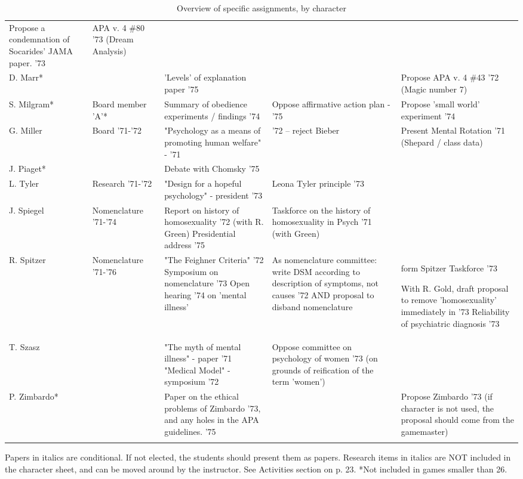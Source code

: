 \begin{refsection}
\begin{longtable}[!t]{ | p{1cm} | p{2cm} | p{6cm} |  p{3cm} |  p{3cm} | }
Propose a condemnation of Socarides' JAMA paper. '73&
APA v. 4 \#80 '73 (Dream Analysis)\\
D. Marr*&
&
'Levels' of explanation paper '75&
&
Propose APA v. 4 \#43 '72 (Magic number 7)\\
S. Milgram*&
Board member 'A'*&
Summary of obedience experiments / findings '74&
Oppose affirmative action plan - '75&
Propose 'small world' experiment '74\\
G. Miller&
Board '71-'72&
"Psychology as a means of promoting human welfare" - '71&
'72 – reject Bieber&
Present Mental Rotation '71 (Shepard / class data)\\
J. Piaget*&
&
Debate with Chomsky '75&
&
\\
L. Tyler&
Research '71-'72&
"Design for a hopeful psychology" - president '73&
Leona Tyler principle '73&
\\
J. Spiegel&
Nomenclature '71-'74&
Report on history of homosexuality '72 (with R. Green)
Presidential address '75&
Taskforce on the history of homosexuality in Psych '71 (with Green)&
\\
R. Spitzer&
Nomenclature '71-'76&
"The Feighner Criteria" '72\newline
Symposium on nomenclature '73\newline
Open hearing '74 on 'mental illness'&

As nomenclature committee: write DSM according to description of symptoms, not causes '72
AND proposal to disband nomenclature & form Spitzer Taskforce '73\newline

With R. Gold, draft proposal to remove 'homosexuality' immediately in '73
Reliability of psychiatric diagnosis '73\\
T. Szasz&
&
"The myth of mental illness" - paper '71\newline
"Medical Model" -  symposium '72&
Oppose committee on psychology of women '73 (on grounds of reification of the term 'women')&
\\
P. Zimbardo*&
&
Paper on the ethical problems of Zimbardo '73, \newline and any holes in the APA guidelines. '75&
&
Propose Zimbardo '73 (if character is not used, the proposal should come from the gamemaster)\\ \hline

\caption{Overview of specific assignments, by character}
\label{table: overviewcharacter}
\end{longtable}

Papers in italics are conditional. If not elected, the students should present them as papers.
Research items in italics are NOT included in the character sheet, and can be moved around by the instructor. See Activities section on p. 23.
*Not included in games smaller than 26.


\end{refsection}
